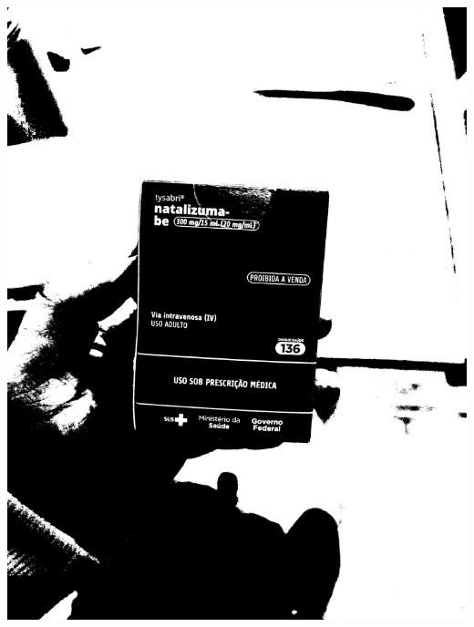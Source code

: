 \begin{frame}
\begin{columns}
\begin{column}{0.24\textwidth}
			\includegraphics[height=0.35\textheight]{../pictures/tysabri_rgb_b_only_thresh.jpg}
			\\\vspace{\floatsep}

\end{column}
\end{columns}
\end{frame}
